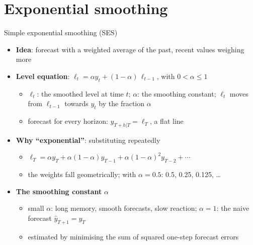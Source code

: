\section{Exponential smoothing}

\begin{frame}{Simple exponential smoothing (SES)}
\itemsize{\small}
\begin{itemize}
    \item \textbf{Idea}: forecast with a weighted average of the past, recent values weighing more
    \item \textbf{Level equation}: $\ell_t = \alpha y_t + (1 - \alpha)\, \ell_{t-1}$, with $0 < \alpha \le 1$
    \begin{itemize}
        \item $\ell_t$: the smoothed level at time $t$; $\alpha$: the smoothing constant; $\ell_t$ moves from $\ell_{t-1}$ towards $y_t$ by the fraction $\alpha$
        \item forecast for every horizon: $\hat y_{T+h|T} = \ell_T$, a flat line
    \end{itemize}
    \item \textbf{Why ``exponential''}: substituting repeatedly
    \begin{itemize}
        \item $\ell_T = \alpha y_T + \alpha(1-\alpha) y_{T-1} + \alpha(1-\alpha)^2 y_{T-2} + \cdots$
        \item the weights fall geometrically; with $\alpha = 0.5$: 0.5, 0.25, 0.125, \ldots
    \end{itemize}
    \item \textbf{The smoothing constant} $\alpha$
    \begin{itemize}
        \item small $\alpha$: long memory, smooth forecasts, slow reaction; $\alpha = 1$: the naive forecast $\hat y_{T+1} = y_T$
        \item estimated by minimising the sum of squared one-step forecast errors
    \end{itemize}
\end{itemize}
\end{frame}

